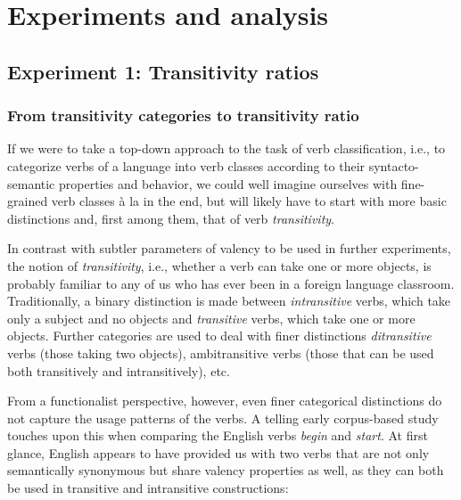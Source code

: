 \chapter{Experiments and analysis}
\section{Experiment 1: Transitivity ratios}\label{sec:exp1}
\subsection{From transitivity categories to transitivity ratio}
If we were to take a top-down approach to the task of verb classification, i.e., to categorize verbs of a language into verb classes according to their syntacto-semantic properties and behavior, we could well imagine ourselves with fine-grained verb classes à la \citet{levin1993} in the end, but will likely have to start with more basic distinctions and, first among them, that of verb \textit{transitivity}. 

In contrast with subtler parameters of valency to be used in further experiments, the notion of \textit{transitivity}, i.e., whether a verb can take one or more objects, is probably familiar to any of us who has ever been in a foreign language classroom. Traditionally, a binary distinction is made between \textit{intransitive} verbs, which take only a subject and no objects and \textit{transitive} verbs, which take one or more objects. Further categories are used to deal with finer distinctions \textit{ditransitive} verbs (those taking two objects), ambitransitive verbs (those that can be used both transitively and intransitively), etc.


From a functionalist perspective, however, even finer categorical distinctions do not capture the usage patterns of the verbs. A telling early corpus-based study \citep{biber1998} touches upon this when comparing the English verbs \textit{begin} and \textit{start}. At first glance, English appears to have provided us with two verbs that are not only semantically synonymous but share valency properties as well, as they can both be used in transitive and intransitive constructions:

\begin{exe}
\ex\label{example-begin_start}
  \begin{xlist}
  \end{xlist}
\end{exe}

